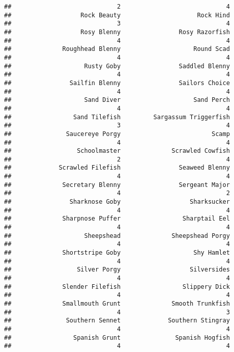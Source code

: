 \documentclass[
]{article}
\begin{document}
\begin{verbatim}
##                             2                             4 
##                   Rock Beauty                     Rock Hind 
##                             3                             4 
##                   Rosy Blenny                Rosy Razorfish 
##                             4                             4 
##              Roughhead Blenny                    Round Scad 
##                             4                             4 
##                    Rusty Goby                Saddled Blenny 
##                             4                             4 
##                Sailfin Blenny                Sailors Choice 
##                             4                             4 
##                    Sand Diver                    Sand Perch 
##                             4                             4 
##                 Sand Tilefish         Sargassum Triggerfish 
##                             3                             4 
##               Saucereye Porgy                         Scamp 
##                             4                             4 
##                  Schoolmaster              Scrawled Cowfish 
##                             2                             4 
##             Scrawled Filefish                Seaweed Blenny 
##                             4                             4 
##              Secretary Blenny                Sergeant Major 
##                             4                             2 
##                Sharknose Goby                   Sharksucker 
##                             4                             4 
##              Sharpnose Puffer                 Sharptail Eel 
##                             4                             4 
##                    Sheepshead              Sheepshead Porgy 
##                             4                             4 
##              Shortstripe Goby                    Shy Hamlet 
##                             4                             4 
##                  Silver Porgy                   Silversides 
##                             4                             4 
##              Slender Filefish                 Slippery Dick 
##                             4                             4 
##              Smallmouth Grunt              Smooth Trunkfish 
##                             4                             3 
##               Southern Sennet             Southern Stingray 
##                             4                             4 
##                 Spanish Grunt               Spanish Hogfish 
##                             4                             4 

\end{verbatim}
\end{document}
